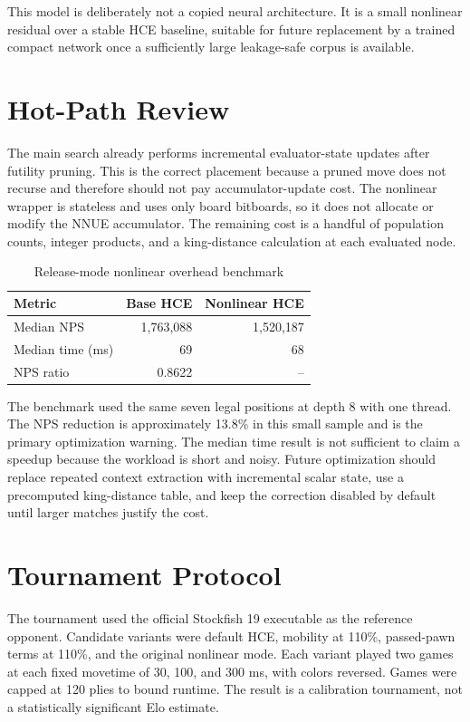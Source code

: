 \documentclass[10pt,conference]{IEEEtran}
\begin{document}
This model is deliberately not a copied neural architecture. It is a small nonlinear residual over a stable HCE baseline, suitable for future replacement by a trained compact network once a sufficiently large leakage-safe corpus is available.

\section{Hot-Path Review}
The main search already performs incremental evaluator-state updates after futility pruning. This is the correct placement because a pruned move does not recurse and therefore should not pay accumulator-update cost. The nonlinear wrapper is stateless and uses only board bitboards, so it does not allocate or modify the NNUE accumulator. The remaining cost is a handful of population counts, integer products, and a king-distance calculation at each evaluated node.

\begin{table}[t]
\centering
\caption{Release-mode nonlinear overhead benchmark}
\begin{tabular}{lrr}
\toprule
Metric & Base HCE & Nonlinear HCE\\
\midrule
Median NPS & 1,763,088 & 1,520,187\\
Median time (ms) & 69 & 68\\
NPS ratio & 0.8622 & --\\
\bottomrule
\end{tabular}
\end{table}

The benchmark used the same seven legal positions at depth 8 with one thread. The NPS reduction is approximately 13.8\% in this small sample and is the primary optimization warning. The median time result is not sufficient to claim a speedup because the workload is short and noisy. Future optimization should replace repeated context extraction with incremental scalar state, use a precomputed king-distance table, and keep the correction disabled by default until larger matches justify the cost.

\section{Tournament Protocol}
The tournament used the official Stockfish 19 executable as the reference opponent. Candidate variants were default HCE, mobility at 110\%, passed-pawn terms at 110\%, and the original nonlinear mode. Each variant played two games at each fixed movetime of 30, 100, and 300 ms, with colors reversed. Games were capped at 120 plies to bound runtime. The result is a calibration tournament, not a statistically significant Elo estimate.
\end{document}
